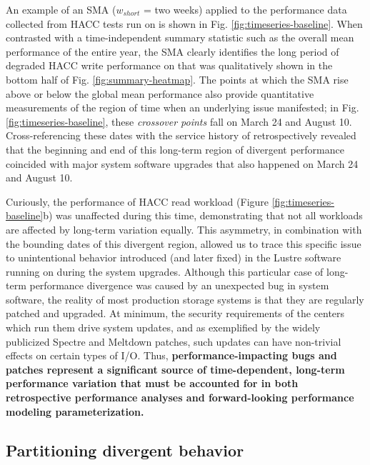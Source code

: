 An example of an SMA ($w_{short}$ = two weeks) applied to the performance data collected from HACC tests run on \cori is shown in Fig. \ref{fig:timeseries-baseline}.
When contrasted with a time-independent summary statistic such as the overall mean performance of the entire year, the SMA clearly identifies the long period of degraded HACC write performance on \cori that was qualitatively shown in the bottom half of Fig. \ref{fig:summary-heatmap}.
The points at which the SMA rise above or below the global mean performance also provide quantitative measurements of the region of time when an underlying issue manifested;
in Fig. \ref{fig:timeseries-baseline}, these \emph{crossover points} fall on March 24 and August 10.
Cross-referencing these dates with the service history of \cori retrospectively revealed that the beginning and end of this long-term region of divergent performance coincided with major system software upgrades that also happened on March 24 and August 10.

Curiously, the performance of HACC read workload (Figure \ref{fig:timeseries-baseline}b) was unaffected during this time, demonstrating that not all workloads are affected by long-term variation equally.
This asymmetry, in combination with the bounding dates of this divergent region, allowed us to trace this specific issue to unintentional behavior introduced (and later fixed) in the Lustre software running on \cori during the system upgrades.
Although this particular case of long-term performance divergence was caused by an unexpected bug in system software, the reality of most production storage systems is that they are regularly patched and upgraded.
At minimum, the security requirements of the centers which run them drive system updates, and as exemplified by the widely publicized Spectre and Meltdown patches, such updates can have non-trivial effects on certain types of I/O.
Thus, \textbf{performance-impacting bugs and patches represent a significant source of time-dependent, long-term performance variation that must be accounted for in both retrospective performance analyses and forward-looking performance modeling parameterization.}





\subsection{Partitioning divergent behavior} \label{sec:features/partitioning}

